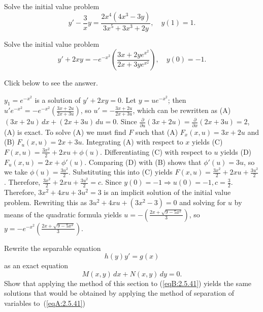 \documentclass{ximera}
\begin{document}
\begin{problem}\label{exer:2.5.39}
Solve the initial value problem
$$
y'-\frac{3}{x}y=\frac{2x^4(4x^3-3y)}{3x^5+3x^3+2y},\quad y(1)=1.
$$
\end{problem}

\begin{problem}\label{exer:2.5.40}
Solve the initial value problem
$$
y'+2xy=-e^{-x^2}\left(\frac{3x+2ye^{x^2}}{2x+3ye^{x^2}}\right),\quad
y(0)=-1.
$$

Click below to see the answer.

\begin{expandable}
    $y_1=e^{-x^2}$ is a solution of $y'+2xy=0$.
Let $y=ue^{-x^2}$; then
$u'e^{-x^2}=-e^{-x^2}\left(\frac{3x+2u}{ 2x+3u}\right)$,
so  $u'=-\frac{3x+2u}{2x+3u}$, which can be rewritten as (A)
$(3x+2u)\,dx+(2x+3u)\,du=0$. Since $\frac{\partial
}{\partial
u}(3x+2u)=\frac{\partial }{\partial x}(2x+3u)=2$, (A)
is exact. To solve (A)
we must find $F$ such that
(A) $F_x(x,u)=3x+2u$ and
(B) $F_u(x,u)=2x+3u$.
Integrating (A) with respect to $x$ yields
(C) $F(x,u)=\frac{3x^2}{2}+2xu+\phi(u)$.
Differentiating (C) with respect to $u$  yields
(D) $F_u(x,u)=2x+\phi'(u)$.
Comparing (D) with (B)  shows that
$\phi'(u)=3u$, so we take
$\phi(u)=\frac{3u^2}{2}$.
Substituting this into (C) yields
$F(x,u)=\frac{3x^2}{2}+2xu+\frac{3u^2}{2}$.
Therefore, $\frac{3x^2}{2}+2xu+\frac{3u^2}{2}=c$.
Since $y(0)=-1\Rightarrow u(0)=-1,
c=\frac{3}{2}$. Therefore,  $3x^2+4xu+3u^2=3$
is an implicit solution of the initial value problem.
Rewriting this as $3u^2+4xu+(3x^2-3)=0$ and
 solving  for $u$ by means of the quadratic formula
yields $u=-\left(\frac{2x+\sqrt{9-5x^2}}{3}\right)$, so
 $y=-e^{-x^2}\left(\frac{2x+\sqrt{9-5x^2}}{3}\right)$.
\end{expandable}
\end{problem}

\begin{problem}\label{exer:2.5.41}
Rewrite the separable equation
\begin{equation}\label{eqA:2.5.41}
h(y)y'=g(x)
\end{equation}
as an exact equation
\begin{equation}\label{eqB:2.5.41}
M(x,y)\,dx+N(x,y)\,dy=0.
\end{equation}
Show that applying the method of this section  to
(\ref{eqB:2.5.41}) yields the same solutions that would be
obtained by applying the method of separation of variables
to~(\ref{eqA:2.5.41})
\end{problem}
\end{document}
